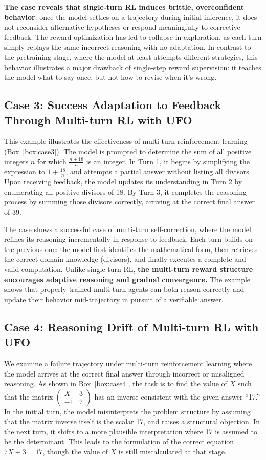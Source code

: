\textbf{The case reveals that single-turn RL induces brittle, overconfident behavior}: once the model settles on a trajectory during initial inference, it does not reconsider alternative hypotheses or respond meaningfully to corrective feedback. The reward optimization has led to collapse in exploration, as each turn simply replays the same incorrect reasoning with no adaptation. In contrast to the pretraining stage, where the model at least attempts different strategies, this behavior illustrates a major drawback of single-step reward supervision: it teaches the model what to say once, but not how to revise when it’s wrong.

\subsection{Case 3: Success Adaptation to Feedback Through Multi-turn RL with UFO }
This example illustrates the effectiveness of multi-turn reinforcement learning (Box~\ref{box:case3}). The model is prompted to determine the sum of all positive integers \(n\) for which \(\frac{n + 18}{n}\) is an integer. In Turn 1, it begins by simplifying the expression to \(1 + \frac{18}{n}\), and attempts a partial answer without listing all divisors. Upon receiving feedback, the model updates its understanding in Turn 2 by enumerating all positive divisors of 18. By Turn 3, it completes the reasoning process by summing those divisors correctly, arriving at the correct final answer of 39.

The case shows a successful case of multi-turn self-correction, where the model refines its reasoning incrementally in response to feedback. Each turn builds on the previous one: the model first identifies the mathematical form, then retrieves the correct domain knowledge (divisors), and finally executes a complete and valid computation. Unlike single-turn RL, \textbf{the multi-turn reward structure encourages adaptive reasoning and gradual convergence.} The example shows that properly trained multi-turn agents can both reason correctly and update their behavior mid-trajectory in pursuit of a verifiable answer.


\subsection{Case 4: Reasoning Drift of Multi-turn RL with UFO}
We examine a failure trajectory under multi-turn reinforcement learning where the model arrives at the correct final answer through incorrect or misaligned reasoning. As shown in Box~\ref{box:case4}, the task is to find the value of \(X\) such that the matrix \(\begin{pmatrix} X & 3 \\ -1 & 7 \end{pmatrix}\) has an inverse consistent with the given answer “17.” In the initial turn, the model misinterprets the problem structure by assuming that the matrix inverse itself is the scalar 17, and raises a structural objection. In the next turn, it shifts to a more plausible interpretation where 17 is assumed to be the determinant. This leads to the formulation of the correct equation \(7X + 3 = 17\), though the value of \(X\) is still miscalculated at that stage.

